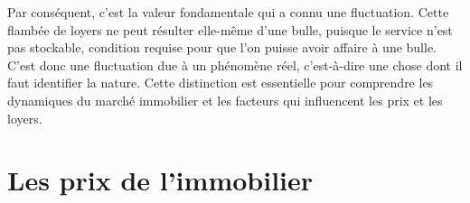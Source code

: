 \documentclass[a4paper, 12pt]{report}
\begin{document}
Par conséquent, c’est la valeur fondamentale qui a connu une fluctuation. Cette flambée de loyers ne peut résulter elle-même d’une bulle, puisque le service n’est pas stockable, condition requise pour que l’on puisse avoir affaire à une bulle. C’est donc une fluctuation due à un phénomène réel, c’est-à-dire une chose dont il faut identifier la nature. Cette distinction est essentielle pour comprendre les dynamiques du marché immobilier et les facteurs qui influencent les prix et les loyers.

\chapter{Les prix de l'immobilier}
\end{document}
